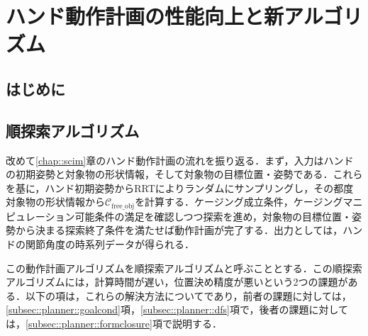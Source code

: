 \documentclass[a4paper,twoside,12pt,papersize, dvipdfmx]{iirthesis}
\begin{document}
    \newcommand{\figref}[1]{\figurename\ref{#1}}
    \newcommand{\tabref}[1]{\tablename\ref{#1}}
    \renewcommand{\eqref}[1]{式~(\ref{#1})}
    \newcommand{\chapref}[1]{\ref{#1}章}
    \newcommand{\secref}[1]{\ref{#1}節}
    \newcommand{\ssecref}[1]{\ref{#1}項}
    \newcommand{\appref}[1]{付録\ref{#1}}
\fi


\chapter{ハンド動作計画の性能向上と新アルゴリズム}\label{chap::planner}
\minitoc

\section{はじめに}\label{sec::planner::intro}

\section{順探索アルゴリズム}\label{sec::planner::straight}
改めて\chapref{chap::scim}のハンド動作計画の流れを振り返る．まず，入力はハンドの初期姿勢と対象物の形状情報，そして対象物の目標位置・姿勢である．これらを基に，ハンド初期姿勢からRRTによりランダムにサンプリングし，その都度対象物の形状情報から$\mathcal{C}_{\mathrm{free\_obj}}$を計算する．ケージング成立条件，ケージングマニピュレーション可能条件の満足を確認しつつ探索を進め，対象物の目標位置・姿勢から決まる探索終了条件を満たせば動作計画が完了する．出力としては，ハンドの関節角度の時系列データが得られる．\par
この動作計画アルゴリズムを順探索アルゴリズムと呼ぶこととする．この順探索アルゴリズムには，計算時間が遅い，位置決め精度が悪いという2つの課題がある．以下の項は，これらの解決方法についてであり，前者の課題に対しては，\ssecref{subsec::planner::goalcond}，\ssecref{subsec::planner::dfs}で，後者の課題に対しては，\ssecref{subsec::planner::formclosure}で説明する．
\end{document}
